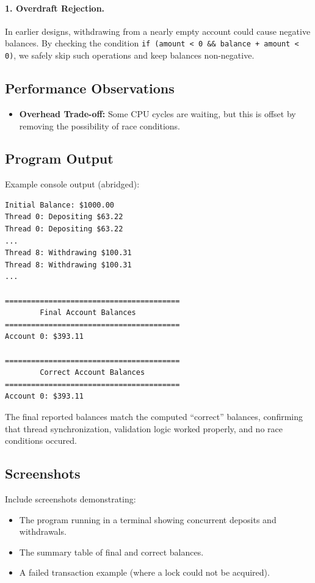 \documentclass[12pt]{article}
\begin{document}
\paragraph{1. Overdraft Rejection.}
In earlier designs, withdrawing from a nearly empty account could cause negative balances.
By checking the condition \texttt{if (amount < 0 \&\& balance + amount < 0)}, we safely skip such operations and keep balances non-negative.

\subsection{Performance Observations}
\begin{itemize}
  \item \textbf{Overhead Trade-off:}
  Some CPU cycles are waiting, but this is offset by removing the possibility of race conditions.
\end{itemize}

\subsection{Program Output}

Example console output (abridged):

\begin{lstlisting}[caption={Phase 2 Output}]
Initial Balance: $1000.00
Thread 0: Depositing $63.22
Thread 0: Depositing $63.22
...
Thread 8: Withdrawing $100.31
Thread 8: Withdrawing $100.31
...

========================================
        Final Account Balances
========================================
Account 0: $393.11

========================================
        Correct Account Balances
========================================
Account 0: $393.11
\end{lstlisting}

The final reported balances match the computed “correct” balances, confirming that thread synchronization, validation logic worked properly, and no race conditions occured.

\subsection{Screenshots}
Include screenshots demonstrating:
\begin{itemize}
  \item The program running in a terminal showing concurrent deposits and withdrawals.
  \item The summary table of final and correct balances.
  \item A failed transaction example (where a lock could not be acquired).
\end{itemize}
\end{document}
